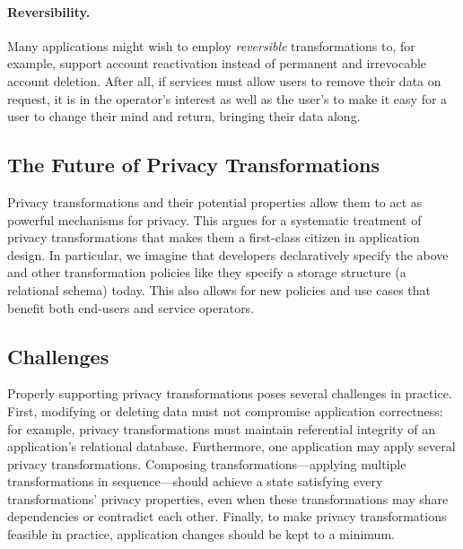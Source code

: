 \paragraph{Reversibility.}
%
Many applications might wish to employ \emph{reversible} transformations to, for example, support
account reactivation instead of permanent and irrevocable account deletion.
%
After all, if services must allow users to remove their data on request, it is in the operator's
interest as well as the user's to make it easy for a user to change their mind and return, bringing their data along.
%
%
%
%

\subsection{The Future of Privacy Transformations}
%
%
Privacy transformations and their potential properties allow them to act as powerful mechanisms for
privacy. This argues for a systematic treatment of privacy transformations that makes them a
first-class citizen in application design.
%
In particular, we imagine that developers declaratively specify the above and other
transformation policies like they specify a storage structure (\eg a relational schema) today.
%
This also allows for new policies and use cases that benefit both end-users and service operators.
%
%

\subsection{Challenges}
%
Properly supporting privacy transformations poses several challenges in practice. First, modifying or
deleting data must not compromise application correctness: for example, privacy transformations must
maintain referential integrity of an application's relational database.
%
Furthermore, one application may apply several privacy transformations. Composing
transformations---applying multiple transformations in sequence---should achieve a state satisfying
every transformations' privacy properties, even when these transformations may share dependencies or
contradict each other.
%
Finally, to make privacy transformations feasible in practice, application changes should be kept to
a minimum.
%

